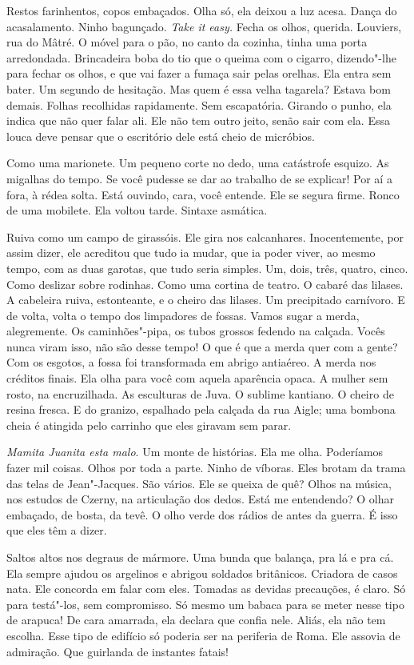 Restos farinhentos, copos embaçados. Olha só, ela deixou a luz acesa.
Dança do acasalamento. Ninho bagunçado. \emph{Take it easy.} Fecha os
olhos, querida. Louviers, rua do Mâtré. O móvel para o pão, no canto da
cozinha, tinha uma porta arredondada. Brincadeira boba do tio que o
queima com o cigarro, dizendo"-lhe para fechar os olhos, e que vai fazer
a fumaça sair pelas orelhas. Ela entra sem bater. Um segundo de
hesitação. Mas quem é essa velha tagarela? Estava bom demais. Folhas
recolhidas rapidamente. Sem escapatória. Girando o punho, ela indica que
não quer falar ali. Ele não tem outro jeito, senão sair com ela. Essa
louca deve pensar que o escritório dele está cheio de micróbios.

Como uma marionete. Um pequeno corte no dedo, uma catástrofe esquizo. As
migalhas do tempo. Se você pudesse se dar ao trabalho de se explicar!
Por aí a fora, à rédea solta. Está ouvindo, cara, você entende. Ele se
segura firme. Ronco de uma mobilete. Ela voltou tarde. Sintaxe asmática.

Ruiva como um campo de girassóis. Ele gira nos calcanhares.
Inocentemente, por assim dizer, ele acreditou que tudo ia mudar, que ia
poder viver, ao mesmo tempo, com as duas garotas, que tudo seria
simples. Um, dois, três, quatro, cinco. Como deslizar sobre rodinhas.
Como uma cortina de teatro. O cabaré das lilases. A cabeleira ruiva,
estonteante, e o cheiro das lilases. Um precipitado carnívoro. E de
volta, volta o tempo dos limpadores de fossas. Vamos sugar a merda,
alegremente. Os caminhões"-pipa, os tubos grossos fedendo na calçada.
Vocês nunca viram isso, não são desse tempo! O que é que a merda quer
com a gente? Com os esgotos, a fossa foi transformada em abrigo
antiaéreo. A merda nos créditos finais. Ela olha para você com aquela
aparência opaca. A mulher sem rosto, na encruzilhada. As esculturas de
Juva. O sublime kantiano. O cheiro de resina fresca. E do granizo,
espalhado pela calçada da rua Aigle; uma bombona cheia é atingida pelo
carrinho que eles giravam sem parar.

\emph{Mamita Juanita esta malo}. Um monte de histórias. Ela me olha.
Poderíamos fazer mil coisas. Olhos por toda a parte. Ninho de víboras.
Eles brotam da trama das telas de Jean"-Jacques. São vários. Ele se
queixa de quê? Olhos na música, nos estudos de Czerny, na articulação
dos dedos. Está me entendendo? O olhar embaçado, de bosta, da tevê. O
olho verde dos rádios de antes da guerra. É isso que eles têm a dizer.

Saltos altos nos degraus de mármore. Uma bunda que balança, pra lá e pra
cá. Ela sempre ajudou os argelinos e abrigou soldados britânicos.
Criadora de casos nata. Ele concorda em falar com eles. Tomadas as
devidas precauções, é claro. Só para testá"-los, sem compromisso. Só
mesmo um babaca para se meter nesse tipo de arapuca! De cara amarrada,
ela declara que confia nele. Aliás, ela não tem escolha. Esse tipo de
edifício só poderia ser na periferia de Roma. Ele assovia de admiração.
Que guirlanda de instantes fatais!

